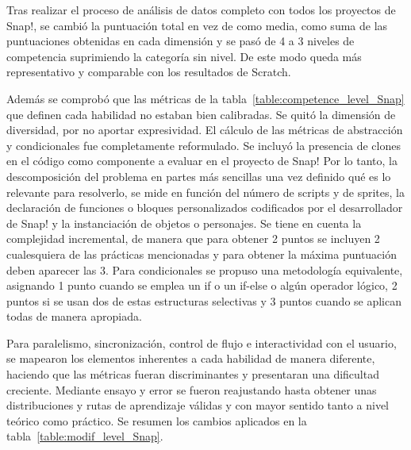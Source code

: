\documentclass[a4paper, 12pt]{book}
\begin{document}
Tras realizar el proceso de análisis de datos completo con todos los proyectos de Snap!, se cambió la puntuación total en vez de como media, como suma de las puntuaciones obtenidas en cada dimensión y se pasó de 4 a 3 niveles de competencia suprimiendo la categoría sin nivel. De este modo queda más representativo y comparable con los resultados de Scratch.

Además se comprobó que las métricas de la tabla~\ref{table:competence_level_Snap} que definen cada habilidad no estaban bien calibradas. Se quitó la dimensión de diversidad, por no aportar expresividad. El cálculo de las métricas de abstracción y condicionales fue completamente reformulado. Se incluyó la presencia de clones en el código como componente a evaluar en el proyecto de Snap! Por lo tanto, la descomposición del problema en partes más sencillas una vez definido qué es lo relevante para resolverlo, se mide en función del número de scripts y de sprites, la declaración de funciones o bloques personalizados codificados por el desarrollador de Snap! y la instanciación de objetos o personajes. Se tiene en cuenta la complejidad incremental, de manera que para obtener 2 puntos se incluyen 2 cualesquiera de las prácticas mencionadas y para obtener la máxima puntuación deben aparecer las 3. Para condicionales se propuso una metodología equivalente, asignando 1 punto cuando se emplea un if o un if-else o algún operador lógico, 2 puntos si se usan dos de estas estructuras selectivas y 3 puntos cuando se aplican todas de manera apropiada.

Para paralelismo, sincronización, control de flujo e interactividad con el usuario, se mapearon los elementos inherentes a cada habilidad de manera diferente, haciendo que las métricas fueran discriminantes y presentaran una dificultad creciente. Mediante ensayo y error se fueron reajustando hasta obtener unas distribuciones y rutas de aprendizaje válidas y con mayor sentido tanto a nivel teórico como práctico. Se resumen los cambios aplicados en la tabla~\ref{table:modif_level_Snap}.
\end{document}

